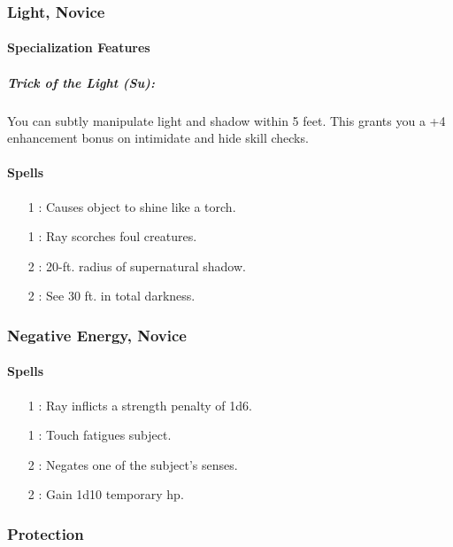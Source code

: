 \subsubsection{Light, Novice}
\paragraph{Specialization Features}
\subparagraph{Trick of the Light (Su):} You can subtly manipulate light and shadow within 5 feet. This grants you a +4 enhancement bonus on intimidate and hide skill checks.
\paragraph{Spells}
\begin{itemize}
 \item[1] : Causes object to shine like a torch.
 \item[1] : Ray scorches foul creatures.
 \item[2] : 20-ft. radius of supernatural shadow.
 \item[2] : See 30 ft. in total darkness.
\end{itemize}

\subsubsection{Negative Energy, Novice}
\label{Spec:NegativeEnergyNovice}
\paragraph{Spells}
\begin{itemize}
 \item[1] : Ray inflicts a strength penalty of 1d6.
 \item[1] : Touch fatigues subject.
 \item[2] : Negates one of the subject's senses.
 \item[2] : Gain 1d10 temporary hp.
\end{itemize}

\subsubsection{Protection}
